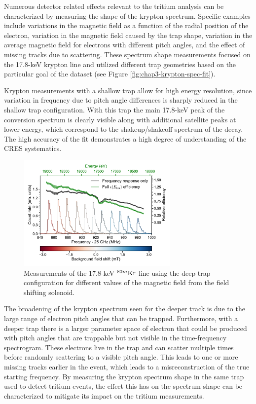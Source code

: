 Numerous detector related effects relevant to the tritium analysis can be characterized by measuring the shape of the krypton spectrum. Specific examples include variations in the magnetic field as a function of the radial position of the electron, variation in the magnetic field caused by the trap shape, variation in the average magnetic field for electrons with different pitch angles, and the effect of missing tracks due to scattering. These spectrum shape measurements focused on the 17.8-keV krypton line and utilized different trap geometries based on the particular goal of the dataset (see Figure \ref{fig:chap3-krypton-spec-fit}).

Krypton measurements with a shallow trap allow for high energy resolution, since variation in frequency due to pitch angle differences is sharply reduced in the shallow trap configuration. With this trap the main 17.8-keV peak of the conversion spectrum is clearly visible along with additional satellite peaks at lower energy, which correspond to the shakeup/shakeoff spectrum of the decay. The high accuracy of the fit demonstrates a high degree of understanding of the CRES systematics.

\begin{figure}[htbp]
    \centering
    \includegraphics[width=0.7\textwidth]{figs/Chapter-3/fss_for_prl_plot.pdf}
    \caption{Measurements of the 17.8-keV $^{83m}\rm{Kr}$ line using the deep trap configuration for different values of the magnetic field from the field shifting solenoid.}
    \label{fig:chap3-fss-plot}
\end{figure}

The broadening of the krypton spectrum seen for the deeper track is due to the large range of electron pitch angles that can be trapped. Furthermore, with a deeper trap there is a larger parameter space of electron that could be produced with pitch angles that are trappable but not visible in the time-frequency spectrogram. These electrons live in the trap and can scatter multiple times before randomly scattering to a visible pitch angle. This leads to one or more missing tracks earlier in the event, which leads to a misreconstruction of the true starting frequency. By measuring the krypton spectrum shape in the same trap used to detect tritium events, the effect this has on the spectrum shape can be characterized to mitigate its impact on the tritium measurements.

